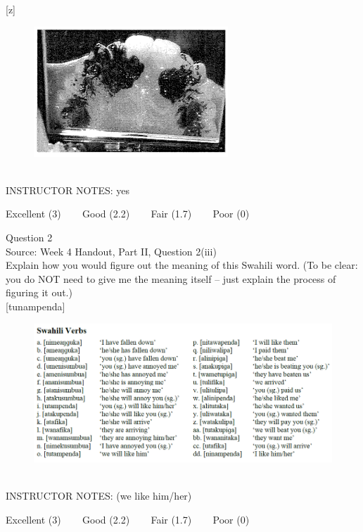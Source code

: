 \documentclass[12pt]{article}
\begin{document}
{[z]}

\begin{figure}[H]
\includegraphics{../images/staticpalatography_fricative.png}
\end{figure}

~\\
INSTRUCTOR NOTES: yes


\vfill
Excellent (3) ~~~ Good (2.2) ~~~ Fair (1.7) ~~~ Poor (0)
\newpage

{\large Question 2}\\

Source: Week 4 Handout, Part II, Question 2(iii)\\

Explain how you would figure out the meaning of this Swahili word. (To be clear: you do NOT need to give me the meaning itself -- just explain the process of figuring it out.)\\

{[tunampenda]}

\begin{figure}[H]
\includegraphics{../images/swahiliverbs.png}
\end{figure}

~\\
INSTRUCTOR NOTES: (we like him/her)


\vfill
Excellent (3) ~~~ Good (2.2) ~~~ Fair (1.7) ~~~ Poor (0)
\newpage

\begin{center}
\textbf{{\color{red}{\HUGE END OF EXAM}}}\\

\end{center}
\newpage
\end{document}
